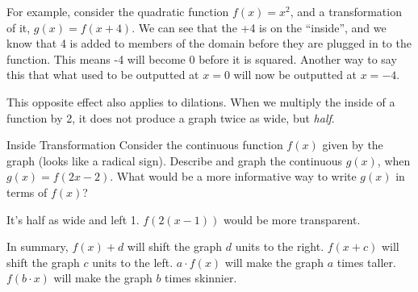 For example, consider the quadratic function $f(x)=x^2$, and a transformation of it, $g(x)=f(x+4)$.
We can see that the +4 is on the ``inside'', and we know that 4 is added to members of the domain
before they are plugged in to the function.  This means -4 will become 0 before it is squared.
Another way to say this that what used to be outputted at $x=0$ will now be outputted at $x=-4$.

This opposite effect also applies to dilations.  When we multiply the inside of a function by 2, it does
not produce a graph twice as wide, but \emph{half}.

\begin{example}{Inside Transformation}
	\exProblem
Consider the continuous function $f(x)$ given by the graph (looks like a radical sign).
Describe and graph the continuous $g(x)$, when $g(x)=f(2x-2)$.  What would be a more
informative way to write $g(x)$ in terms of $f(x)$?

	\exSolution
It's half as wide and left 1.  $f(2(x-1))$ would be more transparent.
\end{example}

In summary, $f(x) + d$ will shift the graph $d$ units to the right.  $f(x+c)$ will shift the graph
$c$ units to the left.  $a\cdot{}f(x)$ will make the graph $a$ times taller.  $f(b\cdot{}x)$ will
make the graph $b$ times skinnier.

~\vfill
